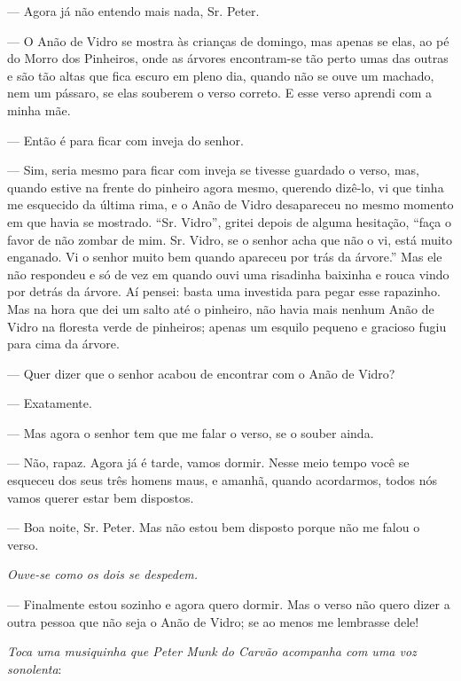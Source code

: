 \begin{myparindent}{0pt}
\begin{Parskip}
 --- Agora já não entendo mais nada, Sr. Peter.

 --- O Anão de Vidro se mostra às crianças de
domingo, mas apenas se elas, ao pé do Morro dos Pinheiros, onde as
árvores encontram-se tão perto umas das outras e são tão altas que fica
escuro em pleno dia, quando não se ouve um machado, nem um pássaro, se
elas souberem o verso correto. E esse verso aprendi com a minha mãe.

 --- Então é para ficar com inveja do senhor.

 --- Sim, seria mesmo para ficar com inveja se
tivesse guardado o verso, mas, quando estive na frente do pinheiro agora
mesmo, querendo dizê-lo, vi que tinha me esquecido da última rima, e o
Anão de Vidro desapareceu no mesmo momento em que havia se mostrado.
``Sr. Vidro'', gritei depois de alguma hesitação, ``faça o favor de não
zombar de mim. Sr. Vidro, se o senhor acha que não o vi, está muito
enganado. Vi o senhor muito bem quando apareceu por trás da árvore.''
Mas ele não respondeu e só de vez em quando ouvi uma risadinha baixinha
e rouca vindo por detrás da árvore. Aí pensei: basta uma investida para
pegar esse rapazinho. Mas na hora que dei um salto até o pinheiro, não
havia mais nenhum Anão de Vidro na floresta verde de pinheiros; apenas
um esquilo pequeno e gracioso fugiu para cima da árvore.

 --- Quer dizer que o senhor acabou de encontrar com o
Anão de Vidro?

 --- Exatamente.

 --- Mas agora o senhor tem que me falar o verso, se o
souber ainda.

 --- Não, rapaz. Agora já é tarde, vamos dormir.
Nesse meio tempo você se esqueceu dos seus três homens maus, e amanhã,
quando acordarmos, todos nós vamos querer estar bem dispostos.

 --- Boa noite, Sr. Peter. Mas não estou bem disposto
porque não me falou o verso.

\emph{Ouve-se como os dois se despedem.}

 --- Finalmente estou sozinho e agora quero dormir.
Mas o verso não quero dizer a outra pessoa que não seja o Anão de Vidro;
se ao menos me lembrasse dele!

\emph{Toca uma musiquinha que Peter Munk do Carvão acompanha com uma voz
sonolenta}:


\end{Parskip}
\end{myparindent}
